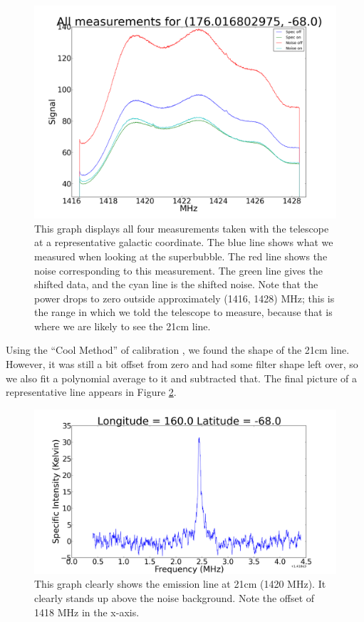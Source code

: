 \documentclass[11pt]{article}
\begin{document}
\begin{figure}
\centering
\includegraphics[scale=0.35]{garphs/all}
\caption{This graph displays all four measurements taken with the telescope at a representative galactic coordinate. The blue line shows what we measured when looking at the superbubble. The red line shows the noise corresponding to this measurement. The green line gives the shifted data, and the cyan line is the shifted noise. Note that the power drops to zero outside approximately (1416, 1428) MHz; this is the range in which we told the telescope to measure, because that is where we are likely to see the 21cm line. \label{spectra}}
\end{figure} 

Using the ``Cool Method'' of calibration , we found the shape of the 21cm line. However, it was still a bit offset from zero and had some filter shape left over, so we also fit a polynomial average to it and subtracted that. The final picture of a representative line appears in Figure \ref{21cm}.

\begin{figure}
\centering
\includegraphics[scale=0.35]{garphs/specint}
\caption{This graph clearly shows the emission line at 21cm (1420 MHz). It clearly stands up above the noise background. Note the offset of 1418 MHz in the x-axis.\label{21cm}}
\end{figure} 
\end{document}
